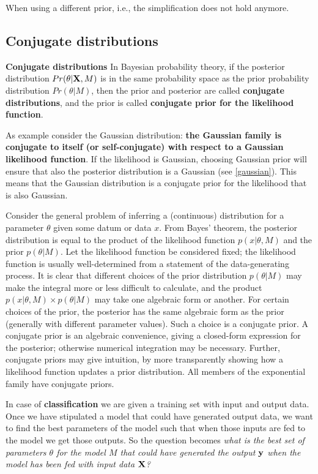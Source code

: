 When using a different prior, i.e., the simplification does not hold anymore.

\subsection{Conjugate distributions}
\label{conjugacy}
\begin{definition}{\textbf{Conjugate distributions}}
In Bayesian probability theory, if the posterior distribution $Pr(\theta|\mathrm{\mathbf{X}},M)$ is in the same probability space as the prior probability distribution $Pr(\theta|M)$, then the prior and posterior are called \textbf{conjugate distributions}, and the prior is called \textbf{conjugate prior for the likelihood function}. 
\end{definition}

As example consider the Gaussian distribution: \textbf{the Gaussian family is conjugate to itself (or self-conjugate) with respect to a Gaussian likelihood function}. If the likelihood is Gaussian, choosing Gaussian prior will ensure that also the posterior distribution is a Gaussian (see \autoref{gaussian}). This means that the Gaussian distribution is a conjugate prior for the likelihood that is also Gaussian.

Consider the general problem of inferring a (continuous) distribution for a parameter $\theta$ given some datum or data $x$. From Bayes' theorem, the posterior distribution is equal to the product of the likelihood function $p(x|\theta, M)$ and the prior $p(\theta|M)$. Let the likelihood function be considered fixed; the likelihood function is usually well-determined from a statement of the data-generating process. It is clear that different choices of the prior distribution $p(\theta|M)$ may make the integral more or less difficult to calculate, and the product $p(x|\theta,M) \times p(\theta|M)$ may take one algebraic form or another. For certain choices of the prior, the posterior has the same algebraic form as the prior (generally with different parameter values). Such a choice is a conjugate prior. A conjugate prior is an algebraic convenience, giving a closed-form expression for the posterior; otherwise numerical integration may be necessary. Further, conjugate priors may give intuition, by more transparently showing how a likelihood function updates a prior distribution.
All members of the exponential family have conjugate priors.

In case of \textbf{classification} we are given a training set with input and output data. Once we have stipulated a model that could have generated output data, we want to find the best parameters of the model such that when those inputs are fed to the model we get those outputs. So the question becomes \textit{what is the best set of parameters $\theta$ for the model $M$ that could have generated the output $\mathbf{y}$ when the model has been fed with input data $\mathrm{\mathbf{X}}$?}

